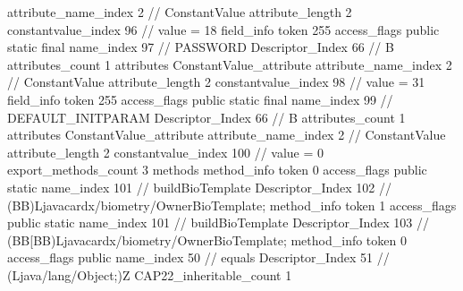{{{{{{{					attribute_name_index	2		// ConstantValue
					attribute_length	2
					constantvalue_index	96		// value = 18
				}
				}
			}
			field_info {
				token	255
				access_flags	public static final
				name_index	97		// PASSWORD
				Descriptor_Index	66		// B
				attributes_count	1
				attributes {
				ConstantValue_attribute {
					attribute_name_index	2		// ConstantValue
					attribute_length	2
					constantvalue_index	98		// value = 31
				}
				}
			}
			field_info {
				token	255
				access_flags	public static final
				name_index	99		// DEFAULT_INITPARAM
				Descriptor_Index	66		// B
				attributes_count	1
				attributes {
				ConstantValue_attribute {
					attribute_name_index	2		// ConstantValue
					attribute_length	2
					constantvalue_index	100		// value = 0
				}
				}
			}
			}
			export_methods_count	3
			methods {
				method_info {
					token	0
					access_flags	public static
					name_index	101		// buildBioTemplate
					Descriptor_Index	102		// (BB)Ljavacardx/biometry/OwnerBioTemplate;
				}
				method_info {
					token	1
					access_flags	public static
					name_index	101		// buildBioTemplate
					Descriptor_Index	103		// (BB[BB)Ljavacardx/biometry/OwnerBioTemplate;
				}
				method_info {
					token	0
					access_flags	public
					name_index	50		// equals
					Descriptor_Index	51		// (Ljava/lang/Object;)Z
				}
			}
			CAP22_inheritable_count	1
		}
	}
}
